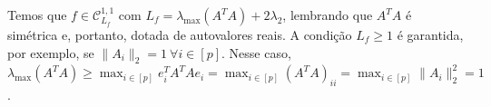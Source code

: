 Temos que $f\in \mathcal{C}^{1,1}_{L_f}$ com $L_f=\lambda_{\max}(A^TA)+2\lambda_2$, lembrando que $A^TA$ é simétrica e, portanto, dotada de autovalores reais. A condição $L_f\geq 1$ é garantida, por exemplo, se $\|A_i\|_2=1\ \forall i\in[p]$. Nesse caso, $\lambda_{\max}(A^TA)\geq \max_{i\in[p]}e_i^TA^TAe_i=\max_{i\in[p]}(A^TA)_{ii}=\max_{i\in[p]}\|A_i\|_2^2=1$.  
